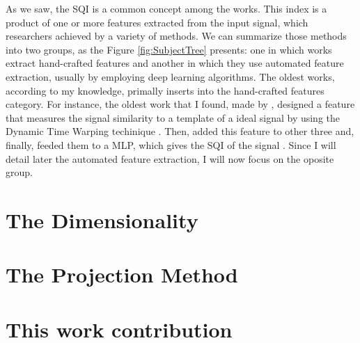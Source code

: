 As we saw, the \acrshort{SQI} is a common concept among the works. This index is a product of one or more features extracted from the input signal, which researchers achieved by a variety of methods. We can summarize those methods into two groups, as the Figure \ref{fig:SubjectTree} presents: one in which works extract hand-crafted features and another in which they use automated feature extraction, usually by employing deep learning algorithms. The oldest works, according to my knowledge, primally inserts into the hand-crafted features category. For instance, the oldest work that I found, made by \citeauthor{review-2}, designed a feature that measures the signal similarity to a template of a ideal signal by using the Dynamic Time Warping techinique \cite{review-2}. Then, \citeauthor{review-2} added this feature to other three and, finally, feeded them to a \acrshort{MLP}, which gives the \acrshort{SQI} of the signal \cite{review-2}. Since I will detail later the automated feature extraction, I will now focus on the oposite group.



\section{The Dimensionality}

\section{The Projection Method}

\section{This work contribution}
